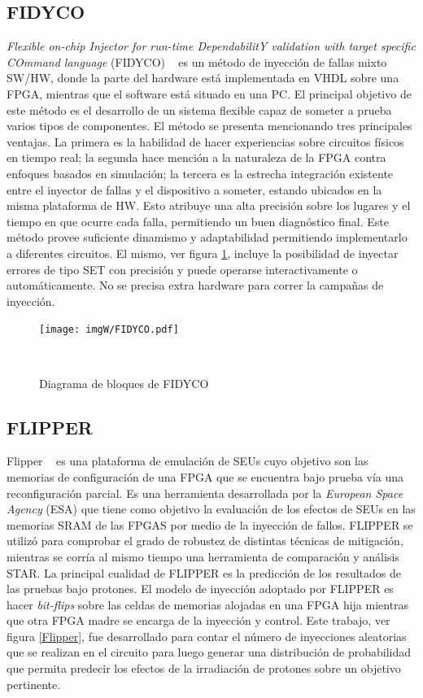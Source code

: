 \documentclass[a4paper,openright,12pt]{report}
\begin{document}
\subsection{FIDYCO}
\textit{Flexible on-chip Injector for run-time DependabilitY validation with target specific COmmand language} (FIDYCO) ~\cite{Rahbaran2004} es un método de inyección de fallas mixto SW/HW, donde la parte del hardware está implementada en VHDL sobre una FPGA, mientras que el software está situado en una PC. El principal objetivo de este método es el desarrollo de un sistema flexible capaz de someter a prueba varios tipos de componentes.
El método se presenta mencionando tres principales ventajas. La primera es la habilidad de hacer experiencias sobre circuitos físicos en tiempo real;  la segunda hace mención a la naturaleza de la FPGA contra enfoques basados en simulación; la tercera es  la estrecha integración existente entre el inyector de fallas y el dispositivo a someter, estando ubicados en la misma plataforma de HW. Esto atribuye una alta precisión  sobre los lugares y  el tiempo en  que ocurre cada falla,  permitiendo un buen  diagnóstico final.
Este método provee  suficiente dinamismo y adaptabilidad permitiendo implementarlo a diferentes circuitos. El mismo, ver figura \ref{FIDYCO},  incluye la posibilidad de inyectar errores de tipo SET con  precisión  y puede operarse interactivamente o automáticamente.
No se precisa  extra hardware  para correr la campañas  de inyección.



\begin{figure}[H]
	\centering
	\texttt{[image: imgW/FIDYCO.pdf]}
	\caption{Diagrama de bloques de FIDYCO}
    ~\cite{Rahbaran2004}
	\label{FIDYCO}
\end{figure}


\subsection{FLIPPER} Flipper ~\cite{Alderighi2010} es una plataforma de emulación de SEUs cuyo objetivo son las memorias de configuración de una FPGA que se encuentra bajo prueba vía una reconfiguración parcial.
Es una herramienta desarrollada por la  \textit{European Space Agency} (ESA) que tiene como objetivo la evaluación de los efectos de SEUs en las memorias SRAM de las FPGAS por medio de la inyección de fallos. FLIPPER se utilizó para comprobar  el grado de robustez de distintas técnicas de mitigación, mientras  se corría al mismo tiempo una herramienta de comparación y análisis STAR. La principal cualidad de FLIPPER es la predicción de los resultados de las pruebas bajo protones. 
El modelo de inyección  adoptado por FLIPPER es hacer \textit{bit-flips} sobre las celdas de memorias alojadas en una FPGA hija mientras que otra FPGA madre se encarga de la inyección y control.
Este trabajo, ver figura \ref{Flipper},  fue desarrollado para contar el número de inyecciones aleatorias que se realizan en el circuito para luego generar una distribución de probabilidad que permita predecir los efectos de la irradiación de protones sobre un objetivo pertinente.  
\end{document}
